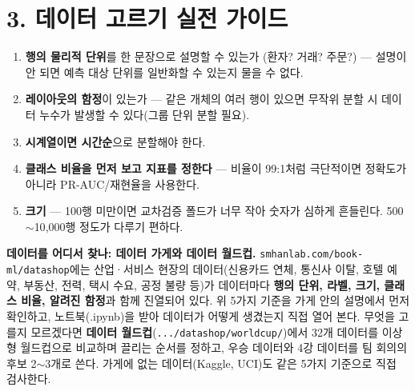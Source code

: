 \documentclass[12pt]{article}
\begin{document}
\section*{3. 데이터 고르기 실전 가이드}
\begin{enumerate}
\item \textbf{행의 물리적 단위}를 한 문장으로 설명할 수 있는가
  (환자? 거래? 주문?) --- 설명이 안 되면 예측 대상 단위를
  일반화할 수 있는지 물을 수 없다.
\item \textbf{레이아웃의 함정}이 있는가 --- 같은 개체의 여러 행이
  있으면 무작위 분할 시 데이터 누수가 발생할 수 있다(그룹 단위
  분할 필요).
\item \textbf{시계열이면 시간순}으로 분할해야 한다.
\item \textbf{클래스 비율을 먼저 보고 지표를 정한다} --- 비율이
  99:1처럼 극단적이면 정확도가 아니라 PR-AUC/재현율을 사용한다.
\item \textbf{크기} --- 100행 미만이면 교차검증 폴드가 너무 작아
  숫자가 심하게 흔들린다. 500$\sim$10{,}000행 정도가 다루기 편하다.
\end{enumerate}

\vspace{4pt}
\noindent\textbf{데이터를 어디서 찾나: 데이터 가게와 데이터 월드컵.}
\texttt{smhanlab.com/book-ml/datashop}에는 산업·서비스 현장의 데이터(신용카드 연체, 통신사 이탈, 호텔 예약, 부동산, 전력, 택시 수요, 공정 불량 등)가 데이터마다 \textbf{행의 단위, 라벨, 크기, 클래스 비율, 알려진 함정}과 함께 진열되어 있다. 위 5가지 기준을 가게 안의 설명에서 먼저 확인하고, 노트북(.ipynb)을 받아 데이터가 어떻게 생겼는지 직접 열어 본다. 무엇을 고를지 모르겠다면 \textbf{데이터 월드컵}(\texttt{.../datashop/worldcup/})에서 32개 데이터를 이상형 월드컵으로 비교하며 끌리는 순서를 정하고, 우승 데이터와 4강 데이터를 팀 회의의 후보 2$\sim$3개로 쓴다. 가게에 없는 데이터(Kaggle, UCI)도 같은 5가지 기준으로 직접 검사한다.
\end{document}
